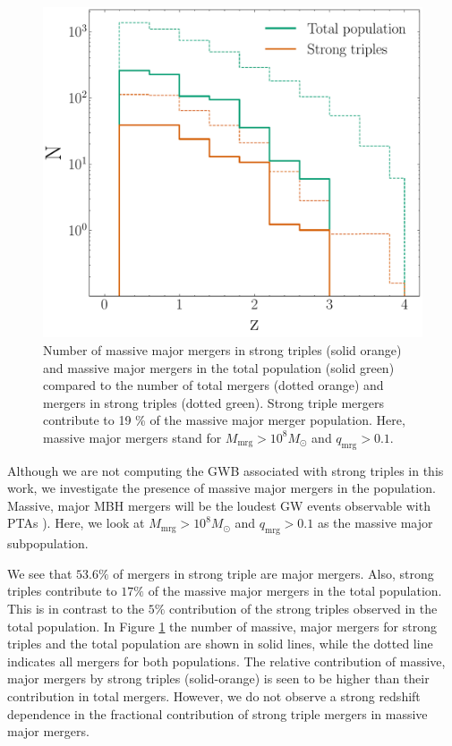 \documentclass[11pt, letterpaper]{article}
\begin{document}
\begin{figure}[!htb] 
    \centering
    \includegraphics[scale=0.45]{fig/strong_triple_massive_major_mergers_N.pdf}
    \caption{Number of massive major mergers in strong triples (solid orange) and massive major mergers in the total population (solid green) compared to the number of total mergers (dotted orange) and mergers in strong triples (dotted green). Strong triple mergers contribute to 19 \% of the massive major merger population. Here, massive major mergers stand for $M_{\text{mrg}} > 10^8 M_{\odot}$ and $q_{\text{mrg}} > 0.1$.}
    \label{fig:massive-major-mergers}
\end{figure}

Although we are not computing the GWB associated with strong triples in this work, we investigate the presence of massive major mergers in the population. Massive, major MBH mergers will be the loudest GW events observable with PTAs \citep{Barausse_2020}). Here, we look at $M_{\text{mrg}} > 10^8 M_{\odot}$ and $q_{\text{mrg}} > 0.1$ as the massive major subpopulation. 

We see that $53.6 \%$ of mergers in strong triple are major mergers. Also, strong triples contribute to $17 \%$ of the massive major mergers in the total population. This is in contrast to the $5 \%$ contribution of the strong triples observed in the total population. In Figure \ref{fig:massive-major-mergers} the number of massive, major mergers for strong triples and the total population are shown in solid lines, while the dotted line indicates all mergers for both populations. The relative contribution of massive, major mergers by strong triples (solid-orange) is seen to be higher than their contribution in total mergers. However, we do not observe a strong redshift dependence in the fractional contribution of strong triple mergers in massive major mergers. 
\end{document}
